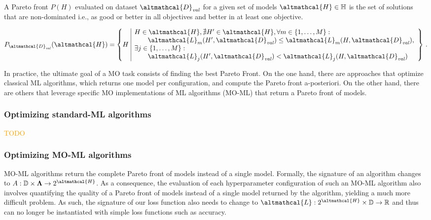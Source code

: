 \begin{definition}
    A Pareto front $P(H)$ evaluated on dataset $\altmathcal{D}_{\mathit{val}}$ for a given set of models $\altmathcal{H} \in \mathbb{H}$ is the set of solutions that are non-dominated i.e., as good or better in all objectives and better in at least one objective.

    \begin{equation*}
        \label{eq:pareto_def}
            P_{\altmathcal{D}_{\mathit{val}}}(\altmathcal{H}) = \left\{ H \,\, \begin{array}{|l}
            H \in \altmathcal{H}, \nexists H' \in \altmathcal{H},
            \forall m \in \{1, \dots, M\} : \\
            \quad\quad\altmathcal{L}_m(H',\altmathcal{D}_{\mathit{val}}) \leq \altmathcal{L}_m(H,\altmathcal{D}_{\mathit{val}}), \\
            \exists j \in \{1, \dots, M\} : \\
            \quad\quad\altmathcal{L}_j(H',\altmathcal{D}_{\mathit{val}}) < \altmathcal{L}_j(H, \altmathcal{D}_{\mathit{val}})
            \end{array}\right\} \, .
        \end{equation*}
\end{definition}

In practice, the ultimate goal of a MO task consists of finding the best Pareto Front.
On the one hand, there are approaches that optimize classical ML algorithms, which returns one model per configuration, and compute the Pareto front a-posteriori.
On the other hand, there are others that leverage specific MO implementations of ML algorithms (MO-ML) that return a Pareto front of models.

\subsubsection{Optimizing standard-ML algorithms}

\textcolor{orange}{TODO}

\subsubsection{Optimizing MO-ML algorithms}

MO-ML algorithms return the complete Pareto front of models instead of a single model.
Formally, the signature of an algorithm changes to $A: \mathbb{D} \times \vec{\Lambda} \rightarrow 2^{\altmathcal{H}}$. As a consequence, the evaluation of each hyperparameter configuration of such an MO-ML algorithm also involves quantifying the quality of a Pareto front of models instead of a single model returned by the algorithm, yielding a much more difficult problem.
As such, the signature of our loss function also needs to change to $\altmathcal{L}: 2^{\altmathcal{H}} \times \mathbb{D} \rightarrow \mathbb{R}$ and thus can no longer be instantiated with simple loss functions such as accuracy.


